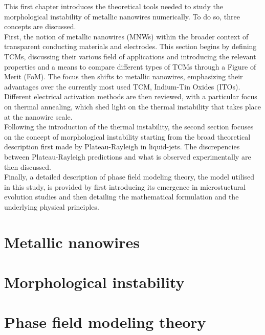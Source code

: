 This first chapter introduces the theoretical tools needed to study the morphological instability of metallic nanowires numerically. To do so, three concepts are discussed.\\
First, the notion of metallic nanowires (MNWs) within the broader context of transparent conducting materials and electrodes. This section begins by defining TCMs, discussing their various field of applications and introducing the relevant properties and a means to compare different types of TCMs through a Figure of Merit (FoM). The focus then shifts to metallic nanowires, emphasizing their advantages over the currently most used TCM, Indium-Tin Oxides (ITOs). Different electrical activation methods are then reviewed, with a particular focus on thermal annealing, which shed light on the thermal instability that takes place at the nanowire scale.\\
Following the introduction of the thermal instability, the second section focuses on the concept of morphological instability starting from the broad theoretical description first made by Plateau-Rayleigh in liquid-jets. The discrepencies between Plateau-Rayleigh predictions and what is observed experimentally are then discussed.\\
Finally, a detailed description of phase field modeling theory, the model utilised in this study, is provided by first introducing its emergence in microstuctural evolution studies and then detailing the mathematical formulation and the underlying physical principles.
\section{Metallic nanowires}
    
\section{Morphological instability}
    

\section{Phase field modeling theory}
    
        
